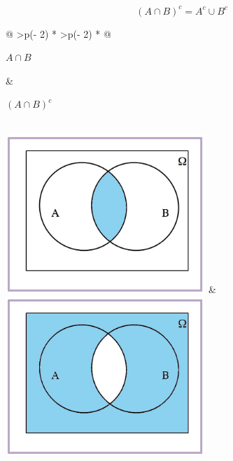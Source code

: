 \documentclass[
  letterpaper,
  DIV=11,
  numbers=noendperiod]{scrreprt}
\begin{document}
\[(A\cap B)^c=A^c\cup B^c\]

\begin{longtable}[]{@{}
  >{\centering\arraybackslash}p{(\columnwidth - 2\tabcolsep) * }
  >{\centering\arraybackslash}p{(\columnwidth - 2\tabcolsep) * }@{}}
\toprule\noalign{}
\begin{minipage}[b]{\linewidth}\centering
\(A\cap B\)
\end{minipage} & \begin{minipage}[b]{\linewidth}\centering
\((A\cap B)^c\)
\end{minipage} \\
\midrule\noalign{}
\endhead
\bottomrule\noalign{}
\endlastfoot
\includegraphics[width=\textwidth,height=6cm]{Images/proba1dibujos/demorgan1.jpg}
&
\includegraphics[width=\textwidth,height=6cm]{Images/proba1dibujos/demorgan2.jpg} \\
\end{longtable}
\end{document}
